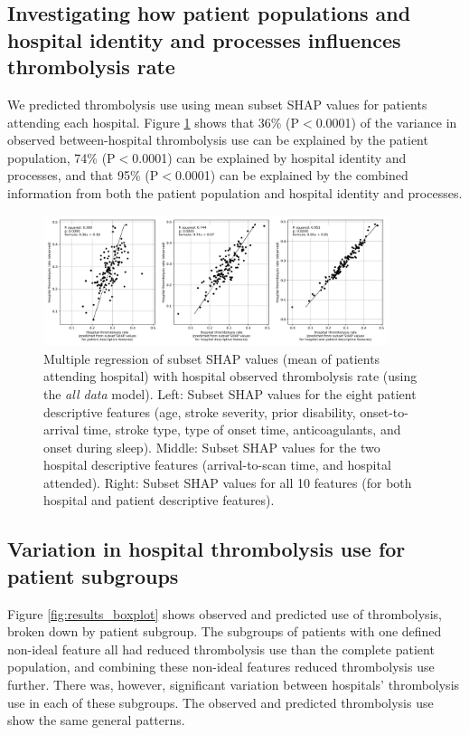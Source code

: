 \subsection{Investigating how patient populations and hospital identity and processes influences thrombolysis rate}

We predicted thrombolysis use using mean subset SHAP values for patients attending each hospital. Figure \ref{fig:shap_multiple_regression} shows that 36\% (P$<$0.0001) of the variance in observed between-hospital thrombolysis use can be explained by the patient population, 74\% (P$<$0.0001) can be explained by hospital identity and processes, and that 95\% (P$<$0.0001) can be explained by the combined information from both the patient population and hospital identity and processes. 

\begin{figure}[!h]
    \centering
    \includegraphics[width=0.9\textwidth]{./images/03f_xgb_10_features_multiple_regression_patient_hospital}
    \caption{Multiple regression of subset SHAP values (mean of patients attending hospital) with hospital observed thrombolysis rate (using the \emph{all data} model). Left: Subset SHAP values for the eight patient descriptive features (age, stroke severity, prior disability, onset-to-arrival time, stroke type, type of onset time, anticoagulants, and onset during sleep). Middle: Subset SHAP values for the two hospital descriptive features (arrival-to-scan time, and hospital attended). Right: Subset SHAP values for all 10 features (for both hospital and patient descriptive features).}
  \label{fig:shap_multiple_regression}
\end{figure}

\subsection{Variation in hospital thrombolysis use for patient subgroups}

Figure \ref{fig:results_boxplot} shows observed and predicted use of thrombolysis, broken down by patient subgroup. The subgroups of patients with one defined non-ideal feature all had reduced thrombolysis use than the complete patient population, and combining these non-ideal features reduced thrombolysis use further. There was, however, significant variation between hospitals' thrombolysis use in each of these subgroups. The observed and predicted thrombolysis use show the same general patterns.

